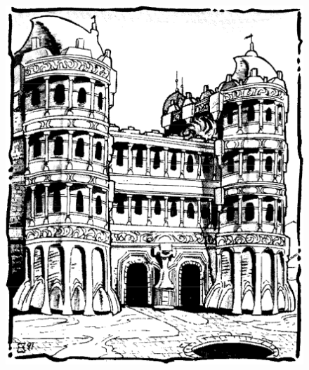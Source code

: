 \begin{figure}[b!]
\centering
\includegraphics[width=\columnwidth]{images/urik-1.png}
\WOTC
\end{figure}

